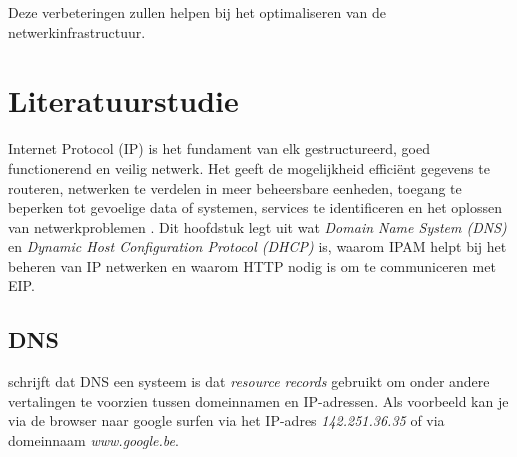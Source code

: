 Deze verbeteringen zullen helpen bij het optimaliseren van de netwerkinfrastructuur.

\section{Literatuurstudie}
\label{sec:begrippen}
Internet Protocol (IP) is het fundament van elk gestructureerd, goed functionerend en veilig netwerk. Het geeft de mogelijkheid efficiënt gegevens te routeren, netwerken te verdelen in meer beheersbare eenheden, toegang te beperken tot gevoelige data of systemen, services te identificeren en het oplossen van netwerkproblemen \autocite{Postel1981}. Dit hoofdstuk legt uit wat \textit{Domain Name System (DNS)} en \textit{Dynamic Host Configuration Protocol (DHCP)} is, waarom IPAM helpt bij het beheren van IP netwerken en waarom HTTP nodig is om te communiceren met EIP. 

\subsection{DNS}
\textcite{Mockapetris1987} schrijft dat DNS een systeem is dat \textit{resource records} gebruikt om onder andere vertalingen te voorzien tussen domeinnamen en IP-adressen. Als voorbeeld kan je via de browser naar google surfen via het IP-adres \textit{142.251.36.35} of via domeinnaam \textit{www.google.be}.

